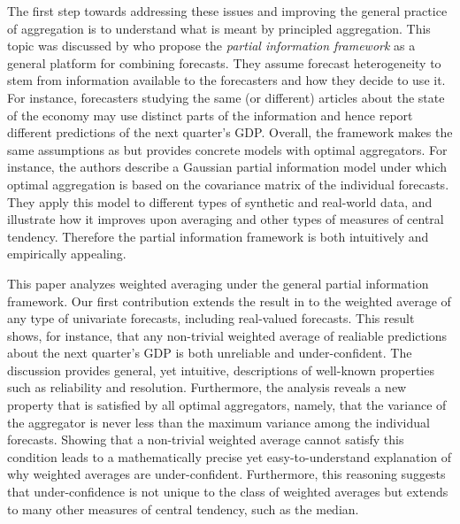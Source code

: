 \documentclass[11pt]{article}
\theoremstyle{definition}
\theoremstyle{definition}
\begin{document}

The first step towards addressing these issues and improving the general practice of aggregation  is to understand what is meant by principled aggregation. This topic was discussed by \cite{satopaamodeling2, satopaamodeling} who propose the \textit{partial information 
framework} as a general platform for combining forecasts. They assume forecast heterogeneity to stem from information available to the forecasters and how they decide to use it. For instance, forecasters studying the same (or different) articles about the state of the economy may use distinct parts of the information and hence report different predictions of the next quarter's GDP. Overall, the framework makes the same assumptions as \cite{Ranjan08} but provides concrete models with optimal aggregators. 
For instance, the authors describe a Gaussian partial information model under which optimal aggregation is based on the covariance matrix of the individual forecasts. They apply this model to different types of synthetic and real-world data, and illustrate how it improves upon averaging and other types of measures of central tendency. Therefore the partial information framework is both intuitively and empirically appealing.
%

This paper analyzes weighted averaging under the general partial information framework. Our first contribution extends the result
in \cite{Ranjan08} to the weighted average of any type of univariate
forecasts, including real-valued forecasts.
This result shows, for instance, that any non-trivial
weighted average of realiable predictions about the next quarter's GDP
is both unreliable and under-confident. The discussion
provides general, yet intuitive, descriptions of well-known properties
such as reliability and resolution. Furthermore, the analysis reveals a new property
that is satisfied by all optimal aggregators, namely, that the variance of
the aggregator is
never less than the maximum variance among the individual
forecasts. Showing that a non-trivial weighted average cannot satisfy
this condition leads to a mathematically precise yet
easy-to-understand explanation of why weighted averages are
under-confident.  Furthermore, this reasoning suggests that
under-confidence is not unique to the class of weighted averages but
extends to many other measures of central tendency, such as the
median.
\end{document}
